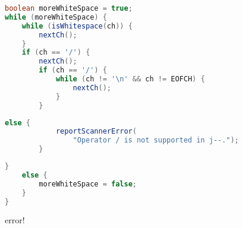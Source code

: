 \documentclass[8pt,a4paper,compress]{beamer}
\begin{document}
\begin{frame}[fragile]
\begin{overprint}
\begin{tcolorbox}[enhanced,drop shadow southwest,sharp corners,size=fbox,colback=white,fontlower=\small\ttfamily,collower=silver900]

\begin{lstlisting}[language=Java,style=focusout]
boolean moreWhiteSpace = true;
while (moreWhiteSpace) {
    while (isWhitespace(ch)) {
        nextCh();
    }
    if (ch == '/') {
        nextCh();
        if (ch == '/') { 
            while (ch != '\n' && ch != EOFCH) {
                nextCh();
            }
        }
\end{lstlisting}
\begin{lstlisting}[language=Java,style=focusin,backgroundcolor=\color{lime100}]
        else {
            reportScannerError(
                "Operator / is not supported in j--.");
        }
\end{lstlisting}
\begin{lstlisting}[language=Java,style=focusout]
    }
    else {
        moreWhiteSpace = false;
    }
}
\end{lstlisting}

\tcblower
\begin{minipage}[t][.25cm][t]{\textwidth}
error!
\end{minipage}
\end{tcolorbox}
\end{overprint}
\end{frame}
\end{document}
